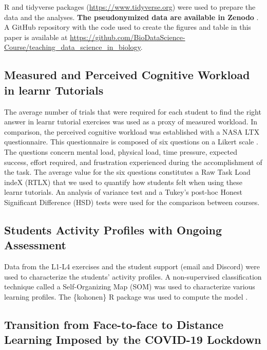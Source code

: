\documentclass{aims}
\theoremstyle{definition}
\begin{document}
R and tidyverse \cite{Wickham2019} packages
(\url{https://www.tidyverse.org}) were used to prepare the data and the
analyses. \textbf{The pseudonymized data are available in Zenodo}
\cite{Grosjeandataset2020, Grosjeandataset2019}. A GitHub repository
with the code used to create the figures and table in this paper is
available at
\url{https://github.com/BioDataScience-Course/teaching_data_science_in_biology}.

\hypertarget{measured-and-perceived-cognitive-workload-in-learnr-tutorials}{%
\subsection{Measured and Perceived Cognitive Workload in learnr
Tutorials}\label{measured-and-perceived-cognitive-workload-in-learnr-tutorials}}

The average number of trials that were required for each student to find
the right answer in learnr tutorial exercises was used as a proxy of
measured workload. In comparison, the perceived cognitive workload was
established with a NASA LTX questionnaire. This questionnaire is
composed of six questions on a Likert scale \cite{Hart1988}. The
questions concern mental load, physical load, time pressure, expected
success, effort required, and frustration experienced during the
accomplishment of the task. The average value for the six questions
constitutes a Raw Task Load indeX (RTLX) \cite{Byers1989} that we used
to quantify how students felt when using these learnr tutorials. An
analysis of variance test and a Tukey's post-hoc Honest Significant
Difference (HSD) tests were used for the comparison between courses.

\hypertarget{students-activity-profiles-with-ongoing-assessment}{%
\subsection{Students Activity Profiles with Ongoing
Assessment}\label{students-activity-profiles-with-ongoing-assessment}}

Data from the L1-L4 exercises and the student support (email and
Discord) were used to characterize the students' activity profiles. A
non-supervised classification technique called a Self-Organizing Map
(SOM) \cite{Kohonen1995} was used to characterize various learning
profiles. The \{kohonen\} R package was used to compute the model
\cite{Wehrens2018}.

\hypertarget{transition-from-face-to-face-to-distance-learning-imposed-by-the-covid-19-lockdown}{%
\subsection{Transition from Face-to-face to Distance Learning Imposed by
the COVID-19
Lockdown}\label{transition-from-face-to-face-to-distance-learning-imposed-by-the-covid-19-lockdown}}
\end{document}

